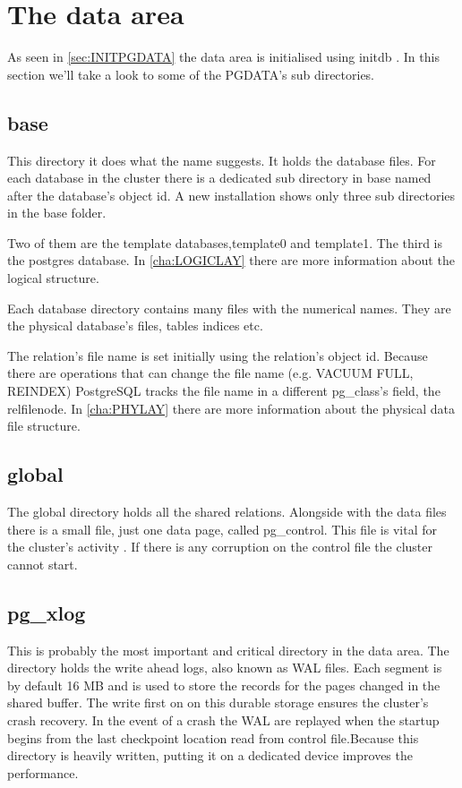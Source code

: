 \section{The data area}
\label{sec:PGDATA}
As seen in \ref{sec:INITPGDATA} the data area is initialised using initdb . In this
section we'll take a look to some of the PGDATA's sub directories.


\subsection{base}
\label{sub:BASE}
This directory it does what the name suggests. It holds the database files. For each database in the
cluster there is a dedicated sub directory in base named after the database's object id.
A new installation shows only three sub directories in the base folder.\newline

Two of them are the template databases,template0 and template1. The third is the postgres database.
In \ref{cha:LOGICLAY}  there are more information about the logical structure.\newline

Each database directory contains many files with the numerical names. They are the
physical database's files, tables indices etc.\newline 

The relation's file name is set initially using the relation's object id. Because there are
operations that  can change the file name (e.g. VACUUM FULL, REINDEX) PostgreSQL tracks the file
name in a different pg\_class's field, the relfilenode. In \ref{cha:PHYLAY} there are
more information about the physical data file structure.

\subsection{global}
The global directory holds all the shared relations. Alongside with the data files there is a small
file, just one data page, called pg\_control. This file is vital for the cluster's activity
. If there is any corruption on the control file the cluster cannot start.

\subsection{pg\_xlog}
This is probably the most important and critical directory in the data area. The directory holds
the write ahead logs,  also known as WAL files. Each segment is by default 16 MB
and is used to store the records for the pages changed in the shared buffer. The write first
on on this durable storage ensures the cluster's crash recovery. In the event of a crash
the WAL are replayed when the startup begins from the last checkpoint location read from control
file.Because this directory is heavily written, putting it on a dedicated device improves the
performance. 

